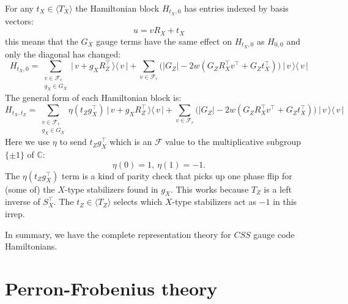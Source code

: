 \documentclass[a4paper,onecolumn,11pt,unpublished]{quantumarticle}
\newcommand{\todo}[1]{\ \textcolor{red}{\{#1\}}\ }
\def\Complex{\mathbb{C}}
\newcommand{\bket}[1]{\bigl|\,{#1}\,\bigr\rangle}
\newcommand{\bbra}[1]{\bigl\langle\,{#1}\,\bigr|}
\def\Span#1{\langle #1 \rangle}
\newcommand{\Field}{\mathcal{F}}
\def\Frd{\Field_{r}}
\begin{document}
For any $t_X\in \Span{T_X}$ the Hamiltonian block $H_{t_X,0}$
has entries indexed by basis vectors:
$$
    u = v R_X + t_X
$$
this means that the $G_X$ gauge terms
have the same effect on $H_{t_X,0}$
as $H_{0,0}$ and only the diagonal has changed:
\begin{equation}\label{hamblocktx}
H_{t_X,0} = \sum_{\substack{v\in\Frd\\g_X\in G_X } }
  \bket{v+g_X  R_Z^\top}\bbra{v} 
  + \sum_{v\in\Frd} \bigl(
    |G_Z| - 2w(G_Z R_X^\top v^\top + G_Z t_X^\top)
    \bigr) \ \bket{v}\bbra{v}
\end{equation}
The general form of
each Hamiltonian block is:
\begin{equation}\label{hamblockgen}
H_{t_X,t_Z} = \sum_{\substack{v\in\Frd\\g_X\in G_X } }
    \eta(t_Z g_X^\top)
  \ \bket{v+g_X  R_Z^\top}\bbra{v} 
  + \sum_{v\in\Frd} \bigl(
    |G_Z| - 2w(G_Z R_X^\top v^\top + G_Z t_X^\top)
    \bigr) \ \bket{v}\bbra{v}
\end{equation}
Here we use $\eta$ to send 
$t_Zg_X^\top$ which is an $\Field$ value
to the multiplicative subgroup $\{\pm1\}$
of $\Complex:$
$$
    \eta(0) = 1,\ \eta(1) = -1.
$$
The $\eta(t_Zg_X^\top)$ term
is a kind of parity check that
picks up one phase flip for (some of)
the $X$-type stabilizers found in $g_X.$
This works because $T_Z$ is a left inverse
of $S_X^\top.$
The $t_Z\in\Span{T_Z}$ selects which
$X$-type stabilizers act as $-1$ in this irrep.

In summary, we have the complete representation
theory for $CSS$ gauge code Hamiltonians.


%

\section{Perron-Frobenius theory}\label{Sec5}
\end{document}
